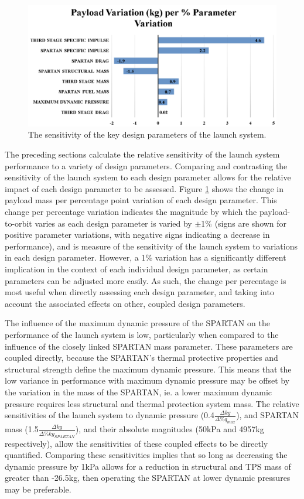 \begin{figure}[ht!]
	\centering
	\includegraphics[width=0.99\linewidth]{figures/5_Ascent/BarChartRelativePayloadChange}
	\caption{The sensitivity of the key design parameters of the launch system.}
	\label{fig:BarChartRelativePayloadChange}
\end{figure}

The preceding sections calculate the relative sensitivity of the launch system performance to a variety of design parameters. 
Comparing and contrasting the sensitivity of the launch system to each design parameter allows for the relative impact of each design parameter to be assessed. 
Figure \ref{fig:BarChartRelativePayloadChange} shows the change in payload mass per percentage point variation of each design parameter. 
This change per percentage variation indicates the magnitude by which the payload-to-orbit varies as each design parameter is varied by $\pm$1\% (signs are shown for positive parameter variations, with negative signs indicating a decrease in performance), and is measure of the sensitivity of the launch system to variations in each design parameter. 
However, a 1\% variation has a significantly different implication in the context of each individual design parameter, as certain parameters can be adjusted more easily. 
As such, the change per percentage is most useful when directly assessing each design parameter, and taking into account the associated effects on other, coupled design parameters. 

The influence of the maximum dynamic pressure of the SPARTAN on the performance of the launch system is low, particularly when compared to the influence of the closely linked SPARTAN mass parameter. These parameters are coupled directly, because the SPARTAN's thermal protective properties and structural strength define the maximum dynamic pressure. This means that the low variance in performance with maximum dynamic pressure may be offset by the variation in the mass of the SPARTAN, ie. a lower maximum dynamic pressure requires less structural and thermal protection system mass.
The relative sensitivities of the launch system to dynamic pressure (0.4$\frac{\Delta kg}{\Delta\%q_{max}}$), and SPARTAN mass (1.5$\frac{\Delta kg}{\Delta\%kg_{SPARTAN}}$), and their absolute magnitudes (50kPa and 4957kg respectively), allow the sensitivities of these coupled effects to be directly quantified. Comparing these sensitivities implies that so long as decreasing the dynamic pressure by 1kPa allows for a reduction in structural and TPS mass of greater than -26.5kg, then operating the SPARTAN at lower dynamic pressures may be preferable. 

